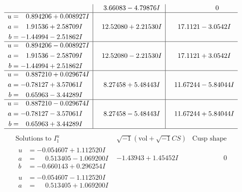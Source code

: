 \documentclass[1p]{elsarticle_modified}
\theoremstyle{definition}
\newcommand{\I}{\sqrt{-1}}
\begin{document}
$$\begin{array}{c|c|c}
 & \phantom{-}3.66083 - 4.79876 I & \phantom{-0.000000 } 0 \\ \hline\begin{aligned}
u &= \phantom{-}0.894206 + 0.008927 I \\
a &= \phantom{-}1.91536 + 2.58709 I \\
b &= -1.44994 - 2.51862 I\end{aligned}
 & \phantom{-}12.52080 + 2.21530 I & \phantom{-}17.1121 - 3.0542 I \\ \hline\begin{aligned}
u &= \phantom{-}0.894206 - 0.008927 I \\
a &= \phantom{-}1.91536 - 2.58709 I \\
b &= -1.44994 + 2.51862 I\end{aligned}
 & \phantom{-}12.52080 - 2.21530 I & \phantom{-}17.1121 + 3.0542 I \\ \hline\begin{aligned}
u &= \phantom{-}0.887210 + 0.029674 I \\
a &= -0.78127 + 3.57061 I \\
b &= \phantom{-}0.65963 - 3.44289 I\end{aligned}
 & \phantom{-}8.27458 + 5.48443 I & \phantom{-}11.67244 - 5.84044 I \\ \hline\begin{aligned}
u &= \phantom{-}0.887210 - 0.029674 I \\
a &= -0.78127 - 3.57061 I \\
b &= \phantom{-}0.65963 + 3.44289 I\end{aligned}
 & \phantom{-}8.27458 - 5.48443 I & \phantom{-}11.67244 + 5.84044 I\\
 \hline 
 \end{array}$$\newpage$$\begin{array}{c|c|c}  
\text{Solutions to }I^u_{1}& \I (\text{vol} + \sqrt{-1}CS) & \text{Cusp shape}\\
 \hline 
\begin{aligned}
u &= -0.054607 + 1.112520 I \\
a &= \phantom{-}0.513405 - 1.069200 I \\
b &= -0.660143 + 0.296254 I\end{aligned}
 & -1.43943 + 1.45452 I & \phantom{-0.000000 } 0 \\ \hline\begin{aligned}
u &= -0.054607 - 1.112520 I \\
a &= \phantom{-}0.513405 + 1.069200 I \\

\end{aligned}
\end{array}$$
\end{document}
